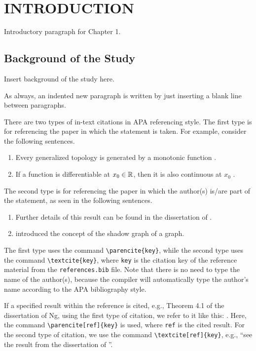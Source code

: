 \chapter{INTRODUCTION}

Introductory paragraph for Chapter 1.

\section{Background of the Study}

Insert background of the study here.

As always, an indented new paragraph is written by just inserting a blank line between paragraphs.

There are two types of in-text citations in APA referencing style. The first type is for referencing the paper in which the statement is taken. For example, consider the following sentences.
\begin{enumerate}
	\item Every generalized topology is generated by a monotonic function \parencite{JlEx}.
	\item If a function is differentiable at $x_0\in\mathbb{R}$, then it is also continuous at $x_0$ \parencite{BkEx}.
\end{enumerate}

The second type is for referencing the paper in which the author(s) is/are part of the statement, as seen in the following sentences.
\begin{enumerate}
	\item Further details of this result can be found in the dissertation of \textcite{ThEx}.
	\item \textcite{bvv11} introduced the concept of the shadow graph of a graph.
\end{enumerate}

The first type uses the command \texttt{\textbackslash parencite\{key\}}, while the second type uses the command \texttt{\textbackslash textcite\{key\}}, where \texttt{key} is the citation key of the reference material from the \texttt{references.bib} file. Note that there is no need to type the name of the author(s), because the compiler will automatically type the author's name according to the APA bibliography style.

If a specified result within the reference is cited, e.g., Theorem 4.1 of the dissertation of Ng, using the first type of citation, we refer to it like this: \parencite[Theorem 4.1]{ThEx}. Here, the command \texttt{\textbackslash parencite[ref]\{key\}} is used, where \texttt{ref} is the cited result. For the second type of citation, we use the command \texttt{\textbackslash textcite[ref]\{key\}}, e.g., ``see the result from the dissertation of \textcite[Theorem 4.1]{ThEx}''.

